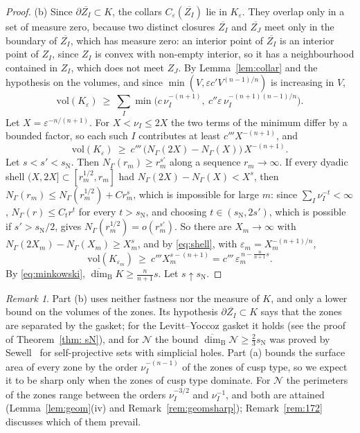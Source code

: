 \documentclass[11pt]{amsart}
\theoremstyle{definition}
\theoremstyle{remark}
\newtheorem{remark}[proposition]{Remark}
\newcommand{\cN}{\mathcal N}
\newcommand{\udimB}{\overline{\dim}_{\mathrm B}}
\newcommand{\sN}{s_{\mathrm N}}
\begin{document}
\begin{proof}
(b) Since $\partial\overline{Z_I}\subset K$, the collars $C_\varepsilon(\overline{Z_I})$ lie in $K_\varepsilon$. They overlap only in a set of measure zero, because two distinct closures $\overline{Z_I}$ and $\overline{Z_J}$ meet only in the boundary of $\overline{Z_I}$, which has measure zero: an interior point of $\overline{Z_I}$ is an interior point of $Z_I$, since $Z_I$ is convex with non-empty interior, so it has a neighbourhood contained in $Z_I$, which does not meet $Z_J$. By Lemma~\ref{lem:collar} and the hypothesis on the volumes, and since $\min(V,\varepsilon c'V^{(n-1)/n})$ is increasing in $V$,
\[
  \mathrm{vol}(K_\varepsilon)\ \ge\ \sum_I\min\bigl(c\,\nu_I^{-(n+1)},\ c''\varepsilon\,\nu_I^{-(n+1)(n-1)/n}\bigr).
\]
Let $X=\varepsilon^{-n/(n+1)}$. For $X<\nu_I\le2X$ the two terms of the minimum differ by a bounded factor, so each such $I$ contributes at least $c'''X^{-(n+1)}$, and
\begin{equation}\label{eq:shell}
  \mathrm{vol}(K_\varepsilon)\ \ge\ c'''\,\bigl(N_\Gamma(2X)-N_\Gamma(X)\bigr)\,X^{-(n+1)} .
\end{equation}
Let $s<s'<\sN$. Then $N_\Gamma(r_m)\ge r_m^{s'}$ along a sequence $r_m\to\infty$. If every dyadic shell $(X,2X]\subset[r_m^{1/2},r_m]$ had $N_\Gamma(2X)-N_\Gamma(X)<X^{s}$, then $N_\Gamma(r_m)\le N_\Gamma(r_m^{1/2})+Cr_m^{s}$, which is impossible for large $m$: since $\sum_I\nu_I^{-t}<\infty$, $N_\Gamma(r)\le C_tr^{t}$ for every $t>\sN$, and choosing $t\in(\sN,2s')$, which is possible if $s'>\sN/2$, gives $N_\Gamma(r_m^{1/2})=o(r_m^{s'})$. So there are $X_m\to\infty$ with $N_\Gamma(2X_m)-N_\Gamma(X_m)\ge X_m^{s}$, and by \eqref{eq:shell}, with $\varepsilon_m=X_m^{-(n+1)/n}$,
\[
  \mathrm{vol}(K_{\varepsilon_m})\ \ge\ c'''X_m^{s-(n+1)}=c'''\,\varepsilon_m^{\,n-\frac{n}{n+1}s}.
\]
By \eqref{eq:minkowski}, $\udimB K\ge\frac n{n+1}s$. Let $s\uparrow\sN$.
\end{proof}

\begin{remark}
Part (b) uses neither fastness nor the measure of $K$, and only a lower bound on the volumes of the zones. Its hypothesis $\partial\overline{Z_I}\subset K$ says that the zones are separated by the gasket; for the Levitt--Yoccoz gasket it holds (see the proof of Theorem~\ref{thm: sN}), and for $\cN$ the bound $\udimB\cN\ge\frac23\sN$ was proved by Sewell~\cite[Thm.~1.8]{Sew23} for self-projective sets with simplicial holes. Part (a) bounds the surface area of every zone by the order $\nu_I^{-(n-1)}$ of the zones of cusp type, so we expect it to be sharp only when the zones of cusp type dominate. For $\cN$ the perimeters of the zones range between the orders $\nu_I^{-3/2}$ and $\nu_I^{-1}$, and both are attained (Lemma~\ref{lem:geom}(iv) and Remark~\ref{rem:geomsharp}); Remark~\ref{rem:172} discusses which of them prevail.
\end{remark}
\end{document}
